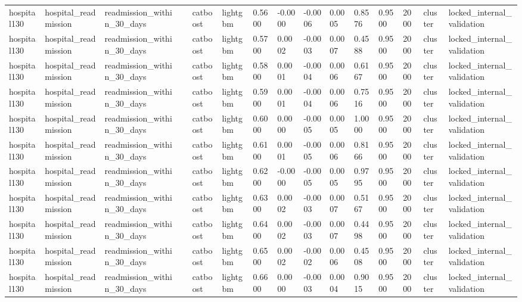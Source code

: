 \begin{tabular}{lllllllllllllll}
hospital130 & hospital\_readmission & readmission\_within\_30\_days &  & catboost & lightgbm & 0.5600 & -0.0000 & -0.0006 & 0.0005 & 0.8576 & 0.9500 & 2000 & cluster & locked\_internal\_validation \\
hospital130 & hospital\_readmission & readmission\_within\_30\_days &  & catboost & lightgbm & 0.5700 & 0.0002 & -0.0003 & 0.0007 & 0.4588 & 0.9500 & 2000 & cluster & locked\_internal\_validation \\
hospital130 & hospital\_readmission & readmission\_within\_30\_days &  & catboost & lightgbm & 0.5800 & 0.0001 & -0.0004 & 0.0006 & 0.6167 & 0.9500 & 2000 & cluster & locked\_internal\_validation \\
hospital130 & hospital\_readmission & readmission\_within\_30\_days &  & catboost & lightgbm & 0.5900 & 0.0001 & -0.0004 & 0.0006 & 0.7516 & 0.9500 & 2000 & cluster & locked\_internal\_validation \\
hospital130 & hospital\_readmission & readmission\_within\_30\_days &  & catboost & lightgbm & 0.6000 & 0.0000 & -0.0005 & 0.0005 & 1.0000 & 0.9500 & 2000 & cluster & locked\_internal\_validation \\
hospital130 & hospital\_readmission & readmission\_within\_30\_days &  & catboost & lightgbm & 0.6100 & 0.0001 & -0.0005 & 0.0006 & 0.8166 & 0.9500 & 2000 & cluster & locked\_internal\_validation \\
hospital130 & hospital\_readmission & readmission\_within\_30\_days &  & catboost & lightgbm & 0.6200 & -0.0000 & -0.0005 & 0.0005 & 0.9795 & 0.9500 & 2000 & cluster & locked\_internal\_validation \\
hospital130 & hospital\_readmission & readmission\_within\_30\_days &  & catboost & lightgbm & 0.6300 & 0.0002 & -0.0003 & 0.0007 & 0.5167 & 0.9500 & 2000 & cluster & locked\_internal\_validation \\
hospital130 & hospital\_readmission & readmission\_within\_30\_days &  & catboost & lightgbm & 0.6400 & 0.0002 & -0.0003 & 0.0007 & 0.4498 & 0.9500 & 2000 & cluster & locked\_internal\_validation \\
hospital130 & hospital\_readmission & readmission\_within\_30\_days &  & catboost & lightgbm & 0.6500 & 0.0002 & -0.0002 & 0.0006 & 0.4508 & 0.9500 & 2000 & cluster & locked\_internal\_validation \\
hospital130 & hospital\_readmission & readmission\_within\_30\_days &  & catboost & lightgbm & 0.6600 & 0.0000 & -0.0003 & 0.0004 & 0.9015 & 0.9500 & 2000 & cluster & locked\_internal\_validation \\

\end{tabular}
